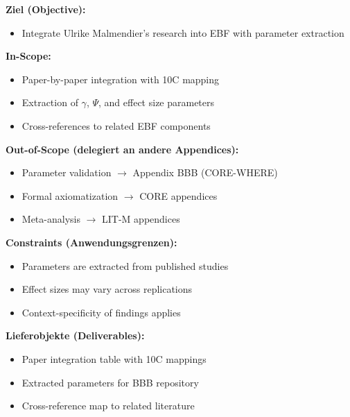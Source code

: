 
\begin{tcolorbox}[
    colback=orange!5!white,
    colframe=orange!75!black,
    title={\textbf{Appendix Scope: Ziel / In-Scope / Out-of-Scope / Constraints}},
    fonttitle=\bfseries
]

\textbf{Ziel (Objective):}
\begin{itemize}[nosep]
    \item Integrate Ulrike Malmendier's research into EBF with parameter extraction
\end{itemize}

\textbf{In-Scope:}
\begin{itemize}[nosep]
    \item Paper-by-paper integration with 10C mapping
    \item Extraction of $\gamma$, $\Psi$, and effect size parameters
    \item Cross-references to related EBF components
\end{itemize}

\textbf{Out-of-Scope (delegiert an andere Appendices):}
\begin{itemize}[nosep]
    \item Parameter validation $\rightarrow$ Appendix BBB (CORE-WHERE)
    \item Formal axiomatization $\rightarrow$ CORE appendices
    \item Meta-analysis $\rightarrow$ LIT-M appendices
\end{itemize}

\textbf{Constraints (Anwendungsgrenzen):}
\begin{itemize}[nosep]
    \item Parameters are extracted from published studies
    \item Effect sizes may vary across replications
    \item Context-specificity of findings applies
\end{itemize}

\textbf{Lieferobjekte (Deliverables):}
\begin{itemize}[nosep]
    \item Paper integration table with 10C mappings
    \item Extracted parameters for BBB repository
    \item Cross-reference map to related literature
\end{itemize}

\end{tcolorbox}

